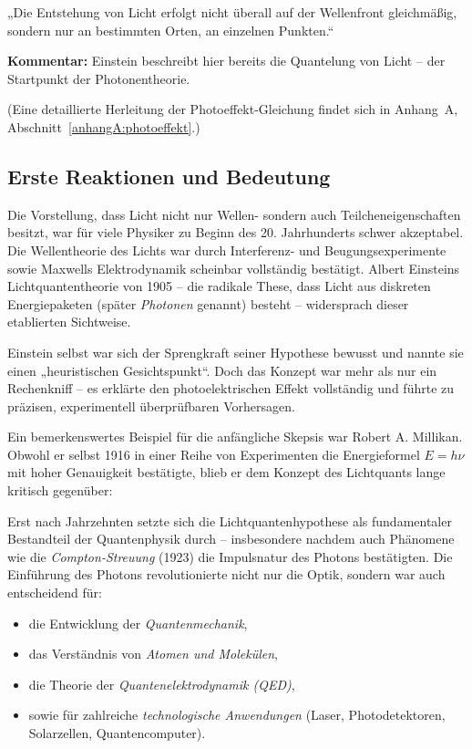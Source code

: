 \begin{tcolorbox}[physikbox, title={Einstein (1905)\cite{einstein_lichtquanten}}]
	\label{box:einstein-lichtquant}
	„Die Entstehung von Licht erfolgt nicht überall auf der Wellenfront gleichmäßig, sondern nur an bestimmten Orten, an einzelnen Punkten.“\
	
	
	\textbf{Kommentar:} Einstein beschreibt hier bereits die Quantelung von Licht – der Startpunkt der Photonentheorie.
\end{tcolorbox}
\vspace{1em}
(Eine detaillierte Herleitung der Photoeffekt-Gleichung findet sich in Anhang~A, Abschnitt~\ref{anhangA:photoeffekt}.)
\subsection{Erste Reaktionen und Bedeutung}

Die Vorstellung, dass Licht nicht nur Wellen- sondern auch Teilcheneigenschaften besitzt, war für viele Physiker zu Beginn des 20. Jahrhunderts schwer akzeptabel. Die Wellentheorie des Lichts war durch Interferenz- und Beugungsexperimente sowie Maxwells Elektrodynamik scheinbar vollständig bestätigt. Albert Einsteins Lichtquantentheorie von 1905 – die radikale These, dass Licht aus diskreten Energiepaketen (später \emph{Photonen} genannt) besteht – widersprach dieser etablierten Sichtweise.

Einstein selbst war sich der Sprengkraft seiner Hypothese bewusst und nannte sie einen „heuristischen Gesichtspunkt“. Doch das Konzept war mehr als nur ein Rechenkniff – es erklärte den photoelektrischen Effekt vollständig und führte zu präzisen, experimentell überprüfbaren Vorhersagen.

Ein bemerkenswertes Beispiel für die anfängliche Skepsis war Robert A. Millikan. Obwohl er selbst 1916 in einer Reihe von Experimenten die Energieformel \( E = h \nu \) mit hoher Genauigkeit bestätigte, blieb er dem Konzept des Lichtquants lange kritisch gegenüber:

Erst nach Jahrzehnten setzte sich die Lichtquantenhypothese als fundamentaler Bestandteil der Quantenphysik durch – insbesondere nachdem auch Phänomene wie die \emph{Compton-Streuung} (1923) die Impulsnatur des Photons bestätigten.
\newpage
\noindent
Die Einführung des Photons revolutionierte nicht nur die Optik, sondern war auch entscheidend für:
\begin{itemize}
	\item die Entwicklung der \emph{Quantenmechanik},
	\item das Verständnis von \emph{Atomen und Molekülen},
	\item die Theorie der \emph{Quantenelektrodynamik (QED)},
	\item sowie für zahlreiche \emph{technologische Anwendungen} (Laser, Photodetektoren, Solarzellen, Quantencomputer).
\end{itemize}

